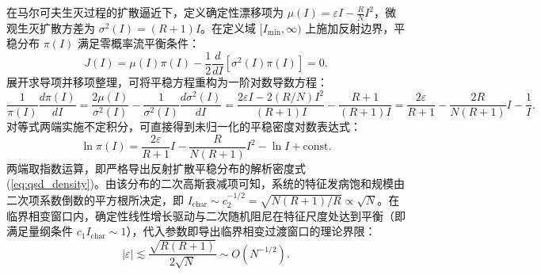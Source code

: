 \documentclass[11pt,a4paper]{article}
\theoremstyle{plain}
\theoremstyle{definition}
\begin{document}
在马尔可夫生灭过程的扩散逼近下，定义确定性漂移项为 $\mu(I) = \varepsilon I - \frac{R}{N}I^2$，微观生灭扩散方差为 $\sigma^2(I) = (R+1)I$。在定义域 $[I_{\min}, \infty)$ 上施加反射边界，平稳分布 $\pi(I)$ 满足零概率流平衡条件：
\begin{equation}
J(I) = \mu(I)\pi(I) - \frac{1}{2}\frac{d}{dI}[\sigma^2(I)\pi(I)] = 0.
\end{equation}
展开求导项并移项整理，可将平稳方程重构为一阶对数导数方程：
\begin{equation}
\frac{1}{\pi(I)}\frac{d\pi(I)}{dI} = \frac{2\mu(I)}{\sigma^2(I)} - \frac{1}{\sigma^2(I)}\frac{d\sigma^2(I)}{dI} = \frac{2\varepsilon I - 2(R/N)I^2}{(R+1)I} - \frac{R+1}{(R+1)I} = \frac{2\varepsilon}{R+1} - \frac{2R}{N(R+1)}I - \frac{1}{I}.
\end{equation}
对等式两端实施不定积分，可直接得到未归一化的平稳密度对数表达式：
\begin{equation}
\ln \pi(I) = \frac{2\varepsilon}{R+1}I - \frac{R}{N(R+1)}I^2 - \ln I + \text{const}.
\end{equation}
两端取指数运算，即严格导出反射扩散平稳分布的解析密度式 (\ref{eq:qsd_density})。由该分布的二次高斯衰减项可知，系统的特征发病饱和规模由二次项系数倒数的平方根所决定，即 $I_{\text{char}} \sim c_2^{-1/2} = \sqrt{N(R+1)/R} \propto \sqrt{N}$。在临界相变窗口内，确定性线性增长驱动与二次随机阻尼在特征尺度处达到平衡（即满足量纲条件 $c_1 I_{\text{char}} \sim 1$），代入参数即导出临界相变过渡窗口的理论界限：
\begin{equation}
|\varepsilon| \lesssim \frac{\sqrt{R(R+1)}}{2\sqrt{N}} \sim O(N^{-1/2}).
\end{equation}
\end{document}
